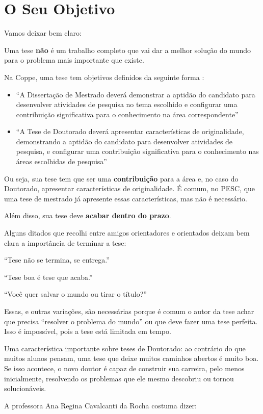 \chapter{O Seu Objetivo}

Vamos deixar bem claro:



Uma tese \textbf{não} é um trabalho completo que vai dar a melhor solução do mundo para o problema mais importante que existe.

Na Coppe, uma tese tem objetivos definidos da seguinte forma :
\begin{itemize}
\item	``A Dissertação de Mestrado deverá demonstrar a aptidão do candidato para desenvolver atividades de pesquisa no tema escolhido e configurar uma contribuição significativa para o conhecimento na área correspondente''
\item	``A Tese de Doutorado deverá apresentar características de originalidade, demonstrando a aptidão do candidato para desenvolver atividades de pesquisa, e configurar uma contribuição significativa para o conhecimento nas áreas escolhidas de pesquisa''
\end{itemize}

Ou seja, sua tese tem que ser uma \textbf{contribuição} para a área e, no caso do Doutorado, apresentar características de originalidade. É comum, no PESC, que uma tese de mestrado já apresente essas características, mas não é necessário.


Além disso, sua tese deve \textbf{acabar dentro do prazo}.

Alguns ditados que recolhi entre amigos orientadores e orientados deixam bem clara a importância de terminar a tese:


``Tese não se termina, se entrega.''

``Tese boa é tese que acaba.''

``Você quer salvar o mundo ou tirar o título?''

Essas, e outras variações, são necessárias porque é comum o autor da tese achar que precisa “resolver o problema do mundo” ou que deve fazer uma tese perfeita. Isso é impossível, pois a tese está limitada em tempo.

Uma característica importante sobre teses de Doutorado: ao contrário do que muitos alunos pensam, uma tese que deixe muitos caminhos abertos é muito boa. Se isso acontece, o novo doutor é capaz de construir sua carreira, pelo menos inicialmente, resolvendo os problemas que ele mesmo descobriu ou tornou solucionáveis.

A professora Ana Regina Cavalcanti da Rocha costuma dizer:





